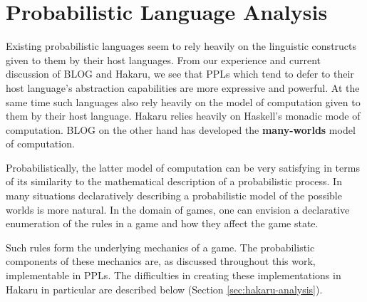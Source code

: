 
\section{Probabilistic Language Analysis} \label{sec:meta-analysis}

Existing probabilistic languages seem to rely heavily on the linguistic
constructs given to them by their host languages. From our experience and
current discussion of BLOG and Hakaru, we see that PPLs
which tend to defer to their host language's abstraction capabilities are more
expressive and powerful. At the same time such languages also rely
heavily on the model of computation given to them by their host language.
Hakaru relies heavily on Haskell's monadic mode of computation. BLOG on
the other hand has developed the {\bf many-worlds} model of computation.

Probabilistically, the latter model of computation can be very satisfying
in terms of its similarity to the mathematical description of a probabilistic
process. In many situations declaratively
describing a probabilistic model of the possible worlds is more natural.
In the domain of games, one can envision a declarative enumeration
of the rules in a game and how they affect the game state.

Such rules form the underlying mechanics of a game. The probabilistic
components of these mechanics are, as discussed throughout this work,
implementable in PPLs. The difficulties in creating these implementations
in Hakaru in particular are described below (Section \ref{sec:hakaru-analysis}).

